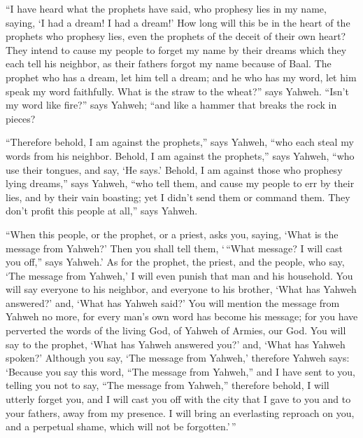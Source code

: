  ``I have heard what the prophets have said, who prophesy
lies in my name, saying, `I had a dream! I had a dream!' 
How long will this be in the heart of the prophets who prophesy lies,
even the prophets of the deceit of their own heart?  They
intend to cause my people to forget my name by their dreams which they
each tell his neighbor, as their fathers forgot my name because of Baal.
 The prophet who has a dream, let him tell a dream; and
he who has my word, let him speak my word faithfully. What is the straw
to the wheat?'' says Yahweh.  ``Isn't my word like
fire?'' says Yahweh; ``and like a hammer that breaks the rock in pieces?

 ``Therefore behold, I am against the prophets,'' says
Yahweh, ``who each steal my words from his neighbor. 
Behold, I am against the prophets,'' says Yahweh, ``who use their
tongues, and say, `He says.'  Behold, I am against those
who prophesy lying dreams,'' says Yahweh, ``who tell them, and cause my
people to err by their lies, and by their vain boasting; yet I didn't
send them or command them. They don't profit this people at all,'' says
Yahweh.

 ``When this people, or the prophet, or a priest, asks
you, saying, `What is the message from Yahweh?' Then you shall tell
them, `\,``What message? I will cast you off,'' says Yahweh.'
 As for the prophet, the priest, and the people, who say,
`The message from Yahweh,' I will even punish that man and his
household.  You will say everyone to his neighbor, and
everyone to his brother, `What has Yahweh answered?' and, `What has
Yahweh said?'  You will mention the message from Yahweh
no more, for every man's own word has become his message; for you have
perverted the words of the living God, of Yahweh of Armies, our God.
 You will say to the prophet, `What has Yahweh answered
you?' and, `What has Yahweh spoken?'  Although you say,
`The message from Yahweh,' therefore Yahweh says: `Because you say this
word, ``The message from Yahweh,'' and I have sent to you, telling you
not to say, ``The message from Yahweh,''  therefore
behold, I will utterly forget you, and I will cast you off with the city
that I gave to you and to your fathers, away from my presence.
 I will bring an everlasting reproach on you, and a
perpetual shame, which will not be forgotten.'\,''

